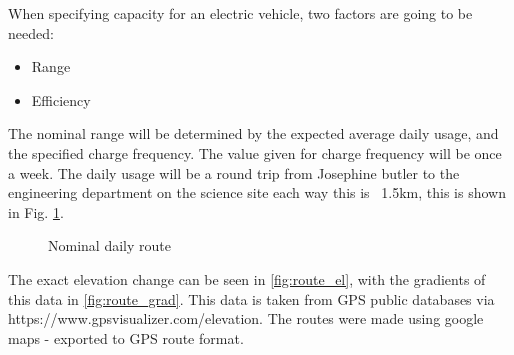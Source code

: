 \documentclass{article}
\begin{document}
When specifying capacity for an electric vehicle, two factors are going to be needed:
\begin{itemize}
    \item Range
    \item Efficiency
\end{itemize}
The nominal range will be determined by the expected average daily usage, and the specified charge frequency. 
The value given for charge frequency will be once a week.
The daily usage will be a round trip from Josephine butler to the engineering department on the science site each way this is ~1.5km, this is shown in Fig. \ref{fig:route}.
\begin{figure}[H]
    \centering
    \caption{Nominal daily route}
    \label{fig:route}
\end{figure}
The exact elevation change can be seen in \ref{fig:route_el}, with the gradients of this data in \ref{fig:route_grad}.
This data is taken from GPS public databases via https://www.gpsvisualizer.com/elevation.
The routes were made using google maps - exported to GPS route format.
\end{document}
